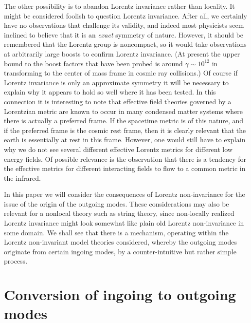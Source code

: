 The other possibility is to abandon Lorentz invariance rather than
locality.  It might be considered foolish to question Lorentz
invariance.  After all, we certainly have no observations that
challenge its validity, and indeed most physicists seem inclined to
believe that it is an {\it exact} symmetry of nature.  However, it
should be remembered that the Lorentz group is noncompact, so it would
take observations at arbitrarily large boosts to confirm Lorentz
invariance. (At present the upper bound to the boost factors that have
been probed is around $\gamma\sim 10^{12}$ in transforming to the
center of mass frame in cosmic ray collisions.) Of course if Lorentz
invariance is only an approximate symmetry it will be necessary to
explain why it appears to hold so well where it has been tested.  In
this connection it is interesting to note that effective field theories
governed by a Lorentzian metric are known to occur in many condensed
matter systems where there is actually a preferred frame. If the
spacetime metric is of this nature, and if the preferred frame is the
cosmic rest frame, then it is clearly relevant that the earth is
essentially at rest in this frame.  However, one would still have to
explain why we do not see several different effective Lorentz metrics
for different low energy fields. Of possible relevance is the
observation\cite{ChadNiel,NielNino} that there is a tendency for the
effective metrics for different interacting fields to flow to a common
metric in the infrared.

In this paper we will consider the consequences of Lorentz
non-invariance for the issue of the origin of the outgoing modes. These
considerations may also be relevant for a nonlocal theory such as
string theory, since non-locally realized Lorentz invariance might look
somewhat like plain old Lorentz non-invariance in some domain. We shall
see that there is a mechanism, operating within the Lorentz
non-invariant model theories considered, whereby the outgoing modes
originate from certain ingoing modes, by a counter-intuitive but rather
simple process.


\section{Conversion of ingoing to outgoing modes}

